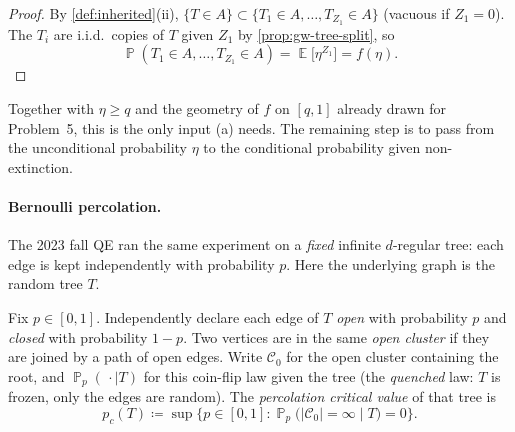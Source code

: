\documentclass[11pt,a4paper]{article}
\DeclareMathOperator{\E}{\mathbb{E}}
\DeclareMathOperator{\Pbb}{\mathbb{P}}
\begin{document}
\begin{proof}
By \cref{def:inherited}(ii), \(\{T\in A\}\subset\{T_1\in A,\dots,T_{Z_1}\in A\}\) (vacuous if \(Z_1=0\)). The \(T_i\) are i.i.d.\ copies of \(T\) given \(Z_1\) by \cref{prop:gw-tree-split}, so
\[
\Pbb(T_1\in A,\dots,T_{Z_1}\in A)
=
\E\bigl[\eta^{Z_1}\bigr]
=
f(\eta).
\]
\end{proof}

Together with \(\eta\ge q\) and the geometry of \(f\) on \([q,1]\) already drawn for Problem~5, this is the only input (a) needs. The remaining step is to pass from the unconditional probability \(\eta\) to the conditional probability given non-extinction.

\paragraph{Bernoulli percolation.}
The 2023 fall QE ran the same experiment on a \emph{fixed} infinite \(d\)-regular tree: each edge is kept independently with probability \(p\). Here the underlying graph is the random tree \(T\).

\begin{center}
\end{center}

\begin{definition}
\label{def:tree-percolation}
Fix \(p\in[0,1]\). Independently declare each edge of \(T\) \emph{open} with probability \(p\) and \emph{closed} with probability \(1-p\). Two vertices are in the same \emph{open cluster} if they are joined by a path of open edges. Write \(\mathcal{C}_0\) for the open cluster containing the root, and \(\Pbb_p(\,\cdot\mid T)\) for this coin-flip law given the tree (the \emph{quenched} law: \(T\) is frozen, only the edges are random). The \emph{percolation critical value} of that tree is
\[
p_c(T)
\coloneqq
\sup\bigl\{p\in[0,1]:\Pbb_p\bigl(|\mathcal{C}_0|=\infty\mid T\bigr)=0\bigr\}.
\]
\end{definition}
\end{document}
